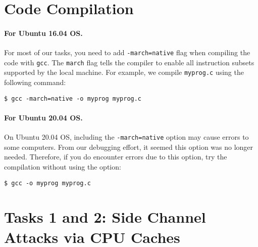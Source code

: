 
\section{Code Compilation}
\label{sidechannel:sec:compilation}


\paragraph{For Ubuntu 16.04 OS.}
For most of our tasks, you need to add \texttt{-march=native}
flag when compiling the code with
\texttt{gcc}. The \texttt{march} flag tells the compiler to enable all
instruction subsets supported by the local machine.
For example, we compile \texttt{myprog.c} using the following command:

\begin{lstlisting}
$ gcc -march=native -o myprog myprog.c
\end{lstlisting}

\paragraph{For Ubuntu 20.04 OS.}
On Ubuntu 20.04 OS, including the \texttt{-march=native} option may 
cause errors to some computers. From our debugging effort,
it seemed this option was no longer needed. Therefore, if you 
do encounter errors due to this option, try the compilation
without using the option:

\begin{lstlisting}
$ gcc -o myprog myprog.c
\end{lstlisting}




\section{Tasks 1 and 2: Side Channel Attacks via CPU Caches}

